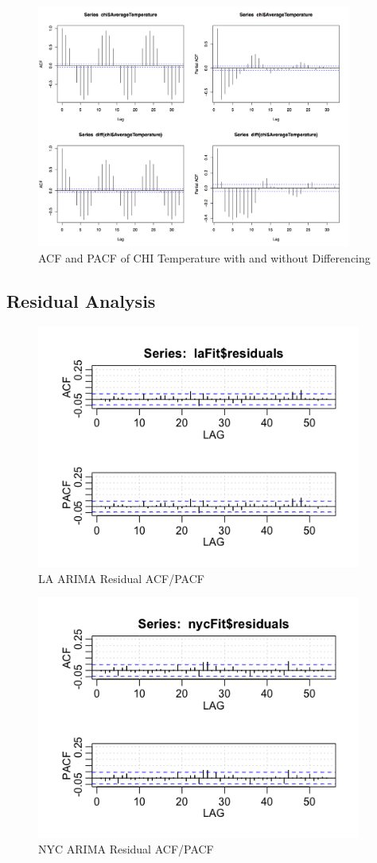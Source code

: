 \documentclass[12pt]{article}
\begin{document}
\begin{figure}[H]
    \includegraphics[width=\textwidth, height=8cm]{Figures/chiACF.png}
    \caption{ACF and PACF of CHI Temperature with and without Differencing}
\end{figure}


\subsection{Residual Analysis} \label{arimaRes}
\begin{figure}[H]
    \includegraphics[width=\textwidth, height=8cm]{Figures/laResACF.png}
    \caption{LA ARIMA Residual ACF/PACF}
\end{figure}

\begin{figure}[H]
    \includegraphics[width=\textwidth, height=8cm]{Figures/nycResACF.png}
    \caption{NYC ARIMA Residual ACF/PACF}
\end{figure}
\end{document}
